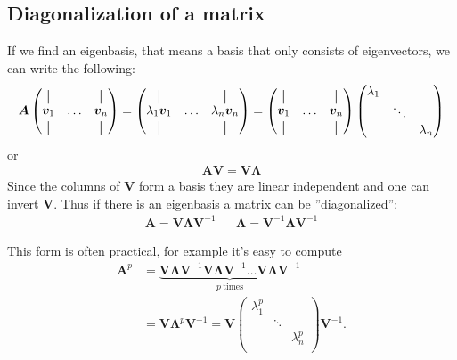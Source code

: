 \subsection{Diagonalization of a matrix}
If we find an eigenbasis, that means a basis that only consists of eigenvectors, we can write the following:
\begin{align}
    \bm{A} \begin{pmatrix}
    \vertbar &        & \vertbar \\
    \bm{v}_1 & \hdots & \bm{v}_n \\
    \vertbar &        & \vertbar 
    \end{pmatrix} = 
    \begin{pmatrix}
        \vertbar &        & \vertbar \\
        \lambda_1\bm{v}_1 & \hdots & \lambda_n\bm{v}_n \\
        \vertbar &        & \vertbar 
    \end{pmatrix} = 
    \begin{pmatrix}
        \vertbar &        & \vertbar \\
        \bm{v}_1 & \hdots & \bm{v}_n \\
        \vertbar &        & \vertbar 
    \end{pmatrix}
    \begin{pmatrix}
        \lambda_1 &        &           \\
                  & \ddots &           \\
                  &        & \lambda_n
        \end{pmatrix}
\end{align} or
\begin{align}
    \bm{AV} = \bm{V\Lambda}
\end{align}
Since the columns of $\bm{V}$ form a basis they are linear independent and one can invert $\bm{V}$. Thus if there is an
eigenbasis a matrix can be ”diagonalized”:
\begin{align}
    \bm{A} = \bm{V\Lambda V}^{-1} && \bm{\Lambda} = \bm{V}^{-1} \bm{\Lambda V}^{-1}
\end{align}

This form is often practical, for example it’s easy to compute
\begin{align}
    \bm{A}^p &=  \underbrace{\bm{V\Lambda V}^{-1} \bm{V\Lambda V}^{-1} \hdots \bm{V\Lambda V}^{-1}}_{p \ \text{times}} \\
             &=  \bm{V\Lambda}^p \bm{V}^{-1} = \bm{V} 
                \begin{pmatrix}
                    \lambda_1^p &        &             \\
                                & \ddots &             \\
                                &        & \lambda_n^p \\
                \end{pmatrix} \bm{V}^{-1}.
\end{align}


